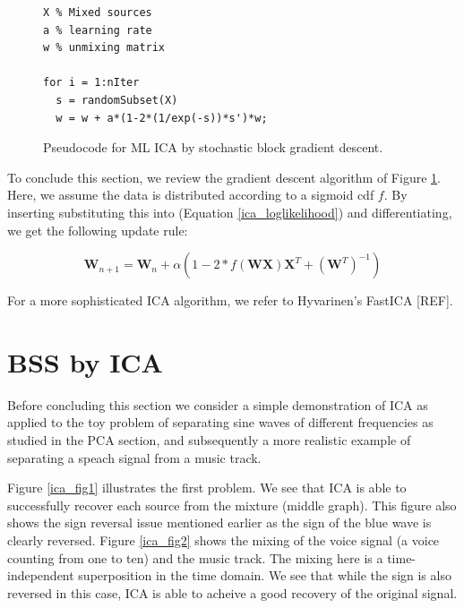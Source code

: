\documentclass[11pt, oneside, a4paper]{report}
\begin{document}
\begin{figure}[!htpb]\label{ica_listing}
  \begin{lstlisting}[frame=single]
% Variables:
X % Mixed sources
a % learning rate
w % unmixing matrix

for i = 1:nIter
  s = randomSubset(X)
  w = w + a*(1-2*(1/exp(-s))*s')*w;  
  \end{lstlisting}
  \caption{Pseudocode for ML ICA by stochastic block gradient descent.}
  \label{mlica_code}
\end{figure}

To conclude this section, we review the gradient descent algorithm of Figure \ref{mlica_code}.
Here, we assume the data is distributed according to a sigmoid cdf $f$. By inserting substituting
this into (Equation \ref{ica_loglikelihood}) and differentiating, we get the following update rule:


\begin{equation}
  \mathbf{W}_{n+1} = \mathbf{W}_{n} + \alpha(1-2*f(\mathbf{W}\mathbf{X})\mathbf{X}^T + (\mathbf{W}^T)^{-1})
\end{equation}

For a more sophisticated ICA algorithm, we refer to Hyvarinen's FastICA [REF].


\section{BSS by ICA}\label{BSS_ICA}

Before concluding this section we consider a simple demonstration of ICA as applied to the toy problem
of separating sine waves of different frequencies as studied in the PCA section, and subsequently a more 
realistic example of separating a speach signal from a music track.

Figure \ref{ica_fig1} illustrates the first problem. We see that ICA is able to successfully recover each source
from the mixture (middle graph). This figure also shows the sign reversal issue mentioned earlier as the sign
of the blue wave is clearly reversed. Figure \ref{ica_fig2} shows the mixing of the voice signal (a voice
counting from one to ten) and the music track. The mixing here is a time-independent superposition in the
time domain. We see that while the sign is also reversed in this case, ICA is able to acheive a good recovery
of the original signal.
\end{document}
